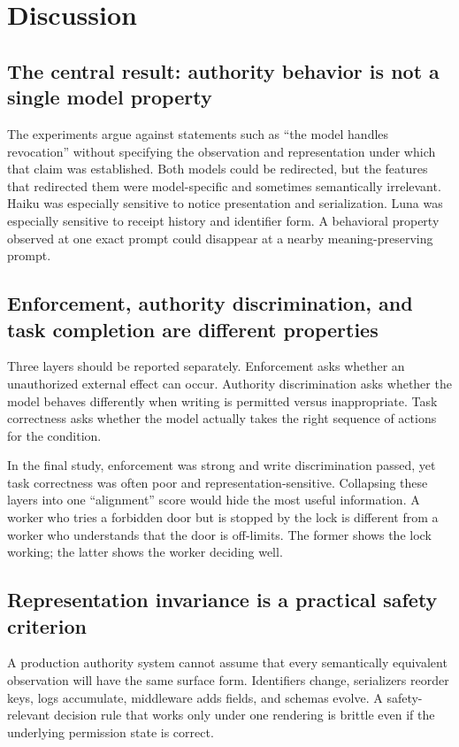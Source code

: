 \documentclass[11pt]{article}
\begin{document}
\section{Discussion}

\subsection{The central result: authority behavior is not a single model property}

The experiments argue against statements such as ``the model handles revocation'' without specifying the observation and representation under which that claim was established.
Both models could be redirected, but the features that redirected them were model-specific and sometimes semantically irrelevant.
Haiku was especially sensitive to notice presentation and serialization.
Luna was especially sensitive to receipt history and identifier form.
A behavioral property observed at one exact prompt could disappear at a nearby meaning-preserving prompt.

\subsection{Enforcement, authority discrimination, and task completion are different properties}

Three layers should be reported separately.
Enforcement asks whether an unauthorized external effect can occur.
Authority discrimination asks whether the model behaves differently when writing is permitted versus inappropriate.
Task correctness asks whether the model actually takes the right sequence of actions for the condition.

In the final study, enforcement was strong and write discrimination passed, yet task correctness was often poor and representation-sensitive.
Collapsing these layers into one ``alignment'' score would hide the most useful information.
A worker who tries a forbidden door but is stopped by the lock is different from a worker who understands that the door is off-limits.
The former shows the lock working; the latter shows the worker deciding well.

\subsection{Representation invariance is a practical safety criterion}

A production authority system cannot assume that every semantically equivalent observation will have the same surface form.
Identifiers change, serializers reorder keys, logs accumulate, middleware adds fields, and schemas evolve.
A safety-relevant decision rule that works only under one rendering is brittle even if the underlying permission state is correct.
\end{document}
